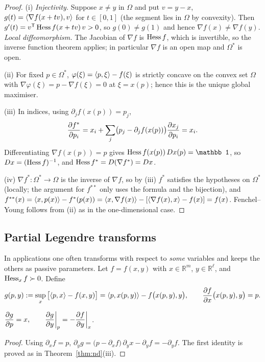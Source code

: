 \begin{proof}
(i) \emph{Injectivity.} Suppose $x\neq y$ in $\Omega$ and put $v=y-x$,
$g(t)=\langle \nabla f(x+tv),v\rangle$ for $t\in[0,1]$ (the segment lies in $\Omega$ by
convexity).  Then $g'(t)=v^{\mathsf T}\operatorname{Hess} f(x+tv)\,v>0$, so
$g(0)\neq g(1)$ and hence $\nabla f(x)\neq\nabla f(y)$.  \emph{Local
diffeomorphism.} The Jacobian of $\nabla f$ is $\operatorname{Hess} f$, which is
invertible, so the inverse function theorem applies; in particular $\nabla f$
is an open map and $\Omega^*$ is open.

(ii) For fixed $p\in\Omega^*$, $\varphi(\xi)=\langle p,\xi\rangle-f(\xi)$ is strictly
concave on the convex set $\Omega$ with $\nabla\varphi(\xi)=p-\nabla f(\xi)=0$ at
$\xi=x(p)$; hence this is the unique global maximiser.

(iii) In indices, using $\partial_jf(x(p))=p_j$,
\[
  \frac{\partial f^*}{\partial p_i}=x_i+\sum_j\bigl(p_j-\partial_jf(x(p))\bigr)\frac{\partial x_j}{\partial p_i}=x_i .
\]
Differentiating $\nabla f(x(p))=p$ gives
$\hess f(x(p))\,Dx(p)=\mathbb 1$, so $Dx=(\operatorname{Hess} f)^{-1}$, and
$\operatorname{Hess} f^*=D(\nabla f^*)=Dx$.

(iv) $\nabla f^*\colon\Omega^*\to\Omega$ is the inverse of $\nabla f$, so
by (iii) $f^*$ satisfies the hypotheses on $\Omega^*$ (locally; the argument
for $f^{**}$ only uses the formula and the bijection), and
$f^{**}(x)=\langle x,p(x)\rangle-f^*(p(x))=\langle x,\nabla f(x)\rangle-[\langle \nabla f(x),x\rangle-f(x)]=f(x)$.
Fenchel--Young follows from (ii) as in the one-dimensional case.
\end{proof}

\subsection{Partial Legendre transforms}

In applications one often transforms with respect to \emph{some} variables
and keeps the others as passive parameters.  Let $f=f(x,y)$ with
$x\in\mathbb{R}^m$, $y\in\mathbb{R}^\ell$, and $\operatorname{Hess}_xf\succ0$.  Define
\[
  g(p,y):=\sup_{x}\,\bigl[\langle p,x\rangle-f(x,y)\bigr]=\langle p,x(p,y)\rangle-f\bigl(x(p,y),y\bigr),
  \qquad \frac{\partial f}{\partial x}\bigl(x(p,y),y\bigr)=p .
\]

\begin{proposition}\label{prop:partial}
$\displaystyle \frac{\partial g}{\partial p}=x,\qquad
 \frac{\partial g}{\partial y}\bigg|_{p}=-\frac{\partial f}{\partial y}\bigg|_{x}$.
\end{proposition}

\begin{proof}
Using $\partial_xf=p$,
$\partial_yg=\bigl(p-\partial_xf\bigr)\,\partial_yx-\partial_yf=-\partial_yf$.
The first identity is proved as in Theorem~\ref{thm:nd}(iii).
\end{proof}

